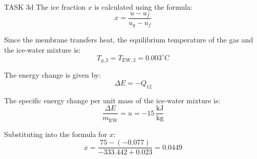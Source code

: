 TASK 3d  
The ice fraction \( x \) is calculated using the formula:  
\[
x = \frac{u - u_f}{u_g - u_f}
\]

Since the membrane transfers heat, the equilibrium temperature of the gas and the ice-water mixture is:  
\[
T_{g,2} = T_{\text{EW},2} = 0.003^\circ\text{C}
\]

The energy change is given by:  
\[
\Delta E = -Q_{12}
\]

The specific energy change per unit mass of the ice-water mixture is:  
\[
\frac{\Delta E}{m_{\text{EW}}} = u = -15 \, \frac{\text{kJ}}{\text{kg}}
\]

Substituting into the formula for \( x \):  
\[
x = \frac{75 - (-0.077)}{-333.442 + 0.023} = 0.0449
\]